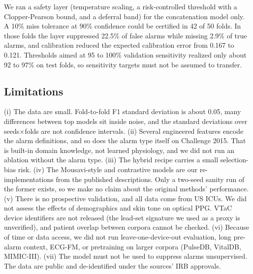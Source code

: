 \documentclass[conference]{IEEEtran}
\begin{document}
We ran a safety layer (temperature scaling, a risk-controlled threshold with a Clopper-Pearson bound, and a deferral band) for the concatenation model only. A 10\% miss tolerance at 90\% confidence could be certified in 42 of 50 folds. In those folds the layer suppressed 22.5\% of false alarms while missing 2.9\% of true alarms, and calibration reduced the expected calibration error from 0.167 to 0.121. Thresholds aimed at 95 to 100\% validation sensitivity realized only about 92 to 97\% on test folds, so sensitivity targets must not be assumed to transfer.

\subsection{Limitations}
(i) The data are small. Fold-to-fold F1 standard deviation is about 0.05, many differences between top models sit inside noise, and the standard deviations over seeds$\times$folds are not confidence intervals. (ii) Several engineered features encode the alarm definitions, and so does the alarm type itself on Challenge 2015. That is built-in domain knowledge, not learned physiology, and we did not run an ablation without the alarm type. (iii) The hybrid recipe carries a small selection-bias risk. (iv) The Mousavi-style and contrastive models are our re-implementations from the published descriptions. Only a two-seed sanity run of the former exists, so we make no claim about the original methods' performance. (v) There is no prospective validation, and all data come from US ICUs. We did not assess the effects of demographics and skin tone on optical PPG. VTaC device identifiers are not released (the lead-set signature we used as a proxy is unverified), and patient overlap between corpora cannot be checked. (vi) Because of time or data access, we did not run leave-one-device-out evaluation, long pre-alarm context, ECG-FM, or pretraining on larger corpora (PulseDB, VitalDB, MIMIC-III). (vii) The model must not be used to suppress alarms unsupervised. The data are public and de-identified under the sources' IRB approvals.

\end{document}
